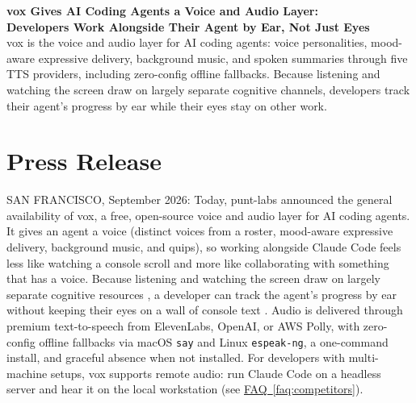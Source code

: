 \documentclass[11pt,letterpaper]{article}
\newcommand{\faqref}[1]{\hyperref[#1]{FAQ~\ref*{#1}}}
\begin{document}
\begin{center}
  {\LARGE\bfseries\color{SectionBlue}
    vox Gives AI Coding Agents a Voice and Audio Layer:\\
    Developers Work Alongside Their Agent by Ear, Not Just Eyes} \\[0.8em]
  {\large\color{AccentGray}
    vox is the voice and audio layer for AI coding agents: voice
    personalities, mood-aware expressive delivery, background music, and
    spoken summaries through five TTS providers, including zero-config
    offline fallbacks. Because listening and watching the screen draw on
    largely separate cognitive channels, developers track their agent's
    progress by ear while their eyes stay on other work.}
\end{center}

\vspace{0.5em}


\section*{Press Release}

SAN FRANCISCO, September 2026: Today, punt-labs announced the general
availability of vox, a free, open-source voice and audio layer for AI
coding agents. It gives an agent a voice (distinct voices from a roster,
mood-aware expressive delivery, background music, and quips), so working
alongside Claude Code feels less like watching a console scroll and more like
collaborating with something that has a voice. Because listening and watching
the screen draw on largely separate cognitive resources
\cite{baddeleyhitch1974workingmemory,baddeley2000episodicbuffer}, a developer
can track the agent's progress by ear without keeping their eyes on a wall of
console text \cite{springer2016audiovisual,mccrickardchewar2003attuning}.
Audio is delivered through premium
text-to-speech from ElevenLabs, OpenAI, or AWS Polly, with zero-config offline
fallbacks via macOS \texttt{say} and Linux \texttt{espeak-ng}, a one-command
install, and graceful absence when not installed. For developers with
multi-machine setups, vox supports remote audio: run Claude Code on a
headless server and hear it on the local workstation
(see \faqref{faq:competitors}).
\end{document}
